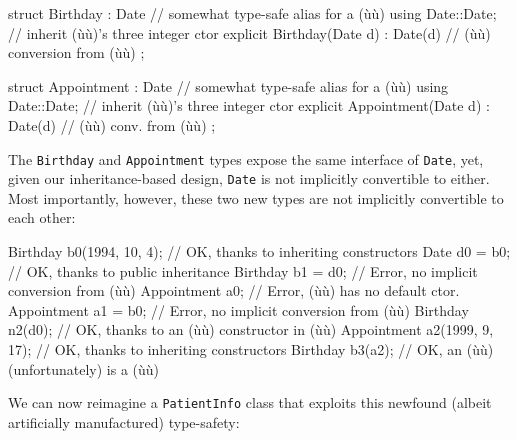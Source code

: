\begin{emcppslisting}[emcppsbatch=e5]
struct Birthday : Date  // somewhat type-safe alias for a (ù{}ù)
{
    using Date::Date;  // inherit (ù{}ù)'s three integer ctor
    explicit Birthday(Date d) : Date(d) { }  // (ù{}ù) conversion from (ù{}ù)
};

struct Appointment : Date  // somewhat type-safe alias for a (ù{}ù)
{
    using Date::Date;  // inherit (ù{}ù)'s three integer ctor
    explicit Appointment(Date d) : Date(d) { }  // (ù{}ù) conv. from (ù{}ù)
};
\end{emcppslisting}
    
\noindent The \lstinline!Birthday! and \lstinline!Appointment! types expose the same
interface of \lstinline!Date!, yet, given our inheritance-based design,
\lstinline!Date! is not implicitly convertible to either. Most importantly,
however, these two new types are not implicitly convertible to each
other:

\begin{emcppslisting}[emcppsbatch=e5]
Birthday b0(1994, 10, 4);  // OK, thanks to inheriting constructors
Date d0 = b0;              // OK, thanks to public inheritance
Birthday b1 = d0;          // Error, no implicit conversion from (ù{}ù)
Appointment a0;            // Error, (ù{}ù) has no default ctor.
Appointment a1 = b0;       // Error, no implicit conversion from (ù{}ù)
Birthday n2(d0);           // OK, thanks to an (ù{}ù) constructor in (ù{}ù)
Appointment a2(1999, 9, 17); // OK, thanks to inheriting constructors           
Birthday    b3(a2);          // OK, an (ù{}ù) (unfortunately) is a (ù{}ù)
\end{emcppslisting}
    
\noindent We can now reimagine a \lstinline!PatientInfo! class that exploits this
newfound (albeit artificially manufactured) type-safety:

